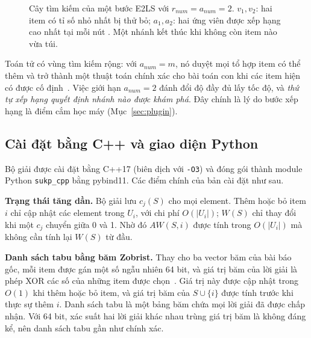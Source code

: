 \begin{figure}[H]
\centering
{}
\caption{Cây tìm kiếm của một bước E2LS với $r_{num}=a_{num}=2$. $v_1,v_2$: hai item có tỉ số nhỏ nhất bị thử bỏ; $a_1,a_2$: hai ứng viên được xếp hạng cao nhất tại mỗi nút \addstar. Một nhánh kết thúc khi không còn item nào vừa túi.}
\label{fig:addstar}
\end{figure}

Toán tử \addstar có vùng tìm kiếm rộng: với $a_{num}=m$, nó duyệt mọi tổ hợp item có thể thêm và trở thành một thuật toán chính xác cho bài toán con khi các item hiện có được cố định~\cite{Zhu2022}. Việc giới hạn $a_{num}=2$ đánh đổi độ đầy đủ lấy tốc độ, và \emph{thứ tự xếp hạng quyết định nhánh nào được khám phá}. Đây chính là lý do bước xếp hạng là điểm cắm học máy (Mục~\ref{sec:plugin}).

\subsection{Cài đặt bằng C++ và giao diện Python}\label{sec:cpp}

Bộ giải được cài đặt bằng C++17 (biên dịch với \texttt{-O3}) và đóng gói thành module Python \texttt{sukp\_cpp} bằng pybind11. Các điểm chính của bản cài đặt như sau.

\textbf{Trạng thái tăng dần.} Bộ giải lưu $c_j(S)$ cho mọi element. Thêm hoặc bỏ item $i$ chỉ cập nhật các element trong $U_i$, với chi phí $O(|U_i|)$; $W(S)$ chỉ thay đổi khi một $c_j$ chuyển giữa 0 và 1. Nhờ đó $AW(S,i)$ được tính trong $O(|U_i|)$ mà không cần tính lại $W(S)$ từ đầu.

\textbf{Danh sách tabu bằng băm Zobrist.} Thay cho ba vector băm của bài báo gốc, mỗi item được gán một số ngẫu nhiên 64 bit, và giá trị băm của lời giải là phép XOR các số của những item được chọn~\cite{Zobrist1970}. Giá trị này được cập nhật trong $O(1)$ khi thêm hoặc bỏ item, và giá trị băm của $S\cup\{i\}$ được tính trước khi thực sự thêm $i$. Danh sách tabu là một bảng băm chứa mọi lời giải đã được chấp nhận. Với 64 bit, xác suất hai lời giải khác nhau trùng giá trị băm là không đáng kể, nên danh sách tabu gần như chính xác.

